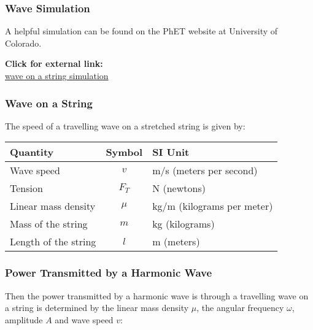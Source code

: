 \documentclass[12pt,aspectratio=169]{beamer}
\newcommand{\eq}[2]{\vspace{#1}{\Large\begin{displaymath}#2\end{displaymath}}}
\begin{document}
\begin{frame}
  \frametitle{Wave Simulation}
  A helpful simulation can be found on the PhET website at University of
  Colorado.
  \begin{center}
    \textbf{Click for external link:}\\
    \href{https://phet.colorado.edu/sims/html/wave-on-a-string/latest/wave-on-a-string_en.html}
         {wave on a string simulation}
  \end{center}
\end{frame}


\begin{frame}
  \frametitle{Wave on a String}
  The speed of a travelling wave on a stretched string is given by:

  \eq{-.2in}{
    \boxed{v=\sqrt{\frac{F_T}{\mu}}}
    \quad\text{\normalsize where}\quad
    \boxed{\mu=\frac{m}{L}}
  }
  \begin{center}
    \begin{tabular}{l|c|l}
      \rowcolor{pink}
      \textbf{Quantity} & \textbf{Symbol} & \textbf{SI Unit} \\ \hline
      Wave speed    & $v$    & \si{m/s} (meters per second) \\
      Tension       & $F_T$  & \si{\newton} (newtons)\\
      Linear mass density & $\mu$ & \si{\kilo\gram/\metre} (kilograms per meter)
      \\
      Mass of the string & $m$    & \si{\kilo\gram} (kilograms)\\
      Length of the string & $l$ & \si{\metre} (meters)
    \end{tabular}
  \end{center}
\end{frame}


\begin{frame}
  \frametitle{Power Transmitted by a Harmonic Wave}
  Then the power transmitted by a harmonic wave is through a travelling wave on
  a string is determined by the linear mass density $\mu$, the angular frequency
  $\omega$, amplitude $A$ and wave speed $v$:

  \eq{-.2in}{
    \boxed{P=\frac{1}{2}\mu\omega^2A^2v}
  }
\end{frame}
\end{document}
